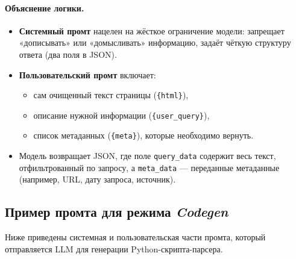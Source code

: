 \paragraph{Объяснение логики.}
\begin{itemize}
    \item \textbf{Системный промт} нацелен на жёсткое ограничение модели: запрещает «дописывать» или «домысливать» информацию, задаёт чёткую структуру ответа (два поля в JSON).
    \item \textbf{Пользовательский промт} включает:
    \begin{itemize}
        \item сам очищенный текст страницы (\verb|{html}|),
        \item описание нужной информации (\verb|{user_query}|),
        \item список метаданных (\verb|{meta}|), которые необходимо вернуть.
    \end{itemize}
    \item Модель возвращает JSON, где поле \texttt{query\_data} содержит весь текст, отфильтрованный по запросу, а \texttt{meta\_data} — переданные метаданные (например, URL, дату запроса, источник).
\end{itemize}

\subsection{Пример промта для режима \emph{Codegen}}

Ниже приведены системная и пользовательская части промта, который отправляется LLM для генерации Python-скрипта-парсера.

